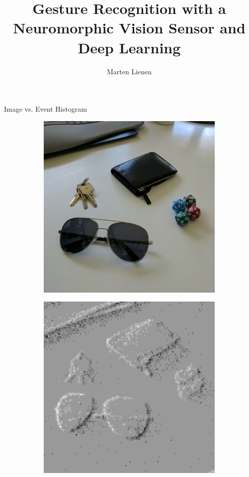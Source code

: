 \documentclass{beamer}
\title{Gesture Recognition with a Neuromorphic Vision Sensor and Deep Learning}
\author{Marten Lienen}
\date{}
\begin{document}
\maketitle

\begin{frame}{Image vs. Event Histogram}
  \begin{figure}
    \centering
    \begin{subfigure}{0.4\textwidth}
      \centering
      \includegraphics[width=\textwidth]{figures/objects-camera}
    \end{subfigure}
    \hspace{0.35in}
    \begin{subfigure}{0.4\textwidth}
      \centering
      \includegraphics[width=\textwidth]{figures/objects-dvs}

\end{subfigure}
\end{figure}
\end{frame}
\end{document}
